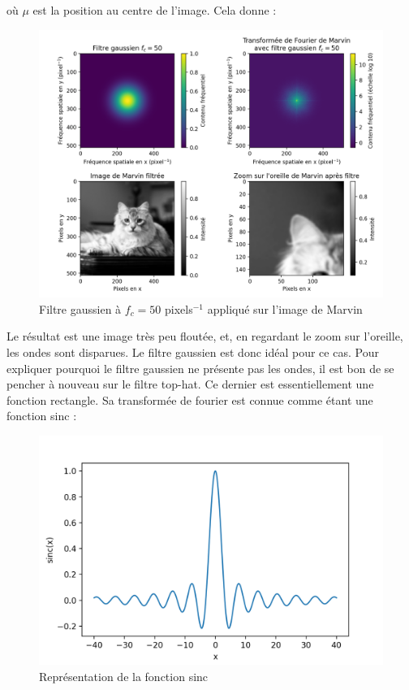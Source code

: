 \documentclass[11pt,letterpaper]{article}
\begin{document}
où $\mu$ est la position au centre de l'image. Cela donne :

\begin{figure}[H]
  \centering
  \includegraphics[scale=0.7]{marvin_gauss_fc_50.png}
  \caption{Filtre gaussien à $f_c = 50$ pixels$^{-1}$ appliqué sur l'image de Marvin}
  \label{gauss}
\end{figure}

Le résultat est une image très peu floutée, et, en regardant le zoom sur l'oreille, les ondes sont disparues. Le filtre gaussien est donc idéal pour ce cas. Pour expliquer pourquoi le filtre gaussien ne présente pas les ondes, il est bon de se pencher à nouveau sur le filtre top-hat. Ce dernier est essentiellement une fonction rectangle. Sa transformée de fourier est connue comme étant une fonction sinc :

\begin{figure}[H]
  \centering
  \includegraphics[scale=0.7]{sinc.png}
  \caption{Représentation de la fonction sinc}
  \label{sinc}
\end{figure}
\end{document}
